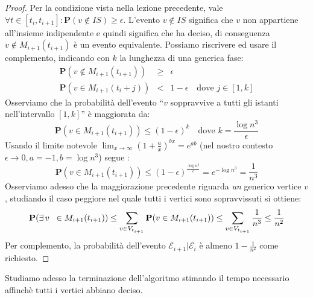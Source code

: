 \documentclass{article}
\begin{document}
\begin{proof}
    Per la condizione vista nella lezione precedente, vale 
    $\forall t \in [t_i,t_{i+1}]: \mathbf{P}(v \not \in IS) \geq \epsilon$. 
    L'evento $v \not \in IS$ significa che $v$ non appartiene all'insieme
    indipendente e quindi significa che ha deciso, di conseguenza 
    $v \not \in M_{i+1}(t_{i+1})$ \`e un evento equivalente. Possiamo
    riscrivere ed usare il complemento, indicando con $k$ la lunghezza
    di una generica fase:
    \begin{displaymath}
    \begin{array} {lcl} 
        \mathbf{P}(v \not \in M_{i+1}(t_{i+1})) & \geq & \epsilon \\
        \mathbf{P}(v \in M_{i+1}(t_i + j)) & < & 1-\epsilon \quad 
            \text{dove } j\in[1,k]
    \end{array}
    \end{displaymath}
    Osserviamo che la probabilit\`a dell'evento ``$v$ soppravvive a tutti
    gli istanti nell'intervallo $[1,k]$'' \`e maggiorata da:
    \begin{displaymath}
        \mathbf{P}(v \in M_{i+1}(t_{i+1})) \leq (1 - \epsilon)^k 
            \quad \text{dove } k = \frac{\log{n}^3}{\epsilon}
    \end{displaymath}
    Usando il limite notevole $\lim_{x \rightarrow \infty}{(1 + 
    \frac{a}{x})^{bx}} = e^{ab}$ (nel nostro contesto $\epsilon \rightarrow 0
    , a = -1, b = \log{n^3}$)
    segue :
    \begin{displaymath}
        \mathbf{P}(v \in M_{i+1}(t_{i+1})) \leq (1 - \epsilon)^
        \frac{\log{n}^3}{\epsilon} = e^{-\log{n}^3} = \frac{1}{n^3}
    \end{displaymath}
    Osserviamo adesso che la maggiorazione precedente riguarda \emph{un}
    generico vertice $v$, studiando il caso peggiore nel quale tutti i 
    vertici sono sopravvissuti si ottiene:
    \begin{displaymath}
        \mathbf{P}(\exists\,v\;\; \in M_{i+1}(t_{i+1})) \leq 
        \sum_{v \in V_{t_{i+1}}}{\mathbf{P}(v \in M_{i+1}(t_{i+1}))} \leq
        \sum_{v \in V_{t_{i+1}}}{\frac{1}{n^3}} \leq
        \frac{1}{n^2}
    \end{displaymath}
    Per complemento, la probabilit\`a dell'evento $\mathcal{E}_{i+1}|
    \mathcal{E}_i$ \`e almeno $1 - \frac{1}{n^2}$ come richiesto.
\end{proof}

Studiamo adesso la terminazione dell'algoritmo stimando il tempo necessario
affinch\`e tutti i vertici abbiano deciso.
\end{document}
